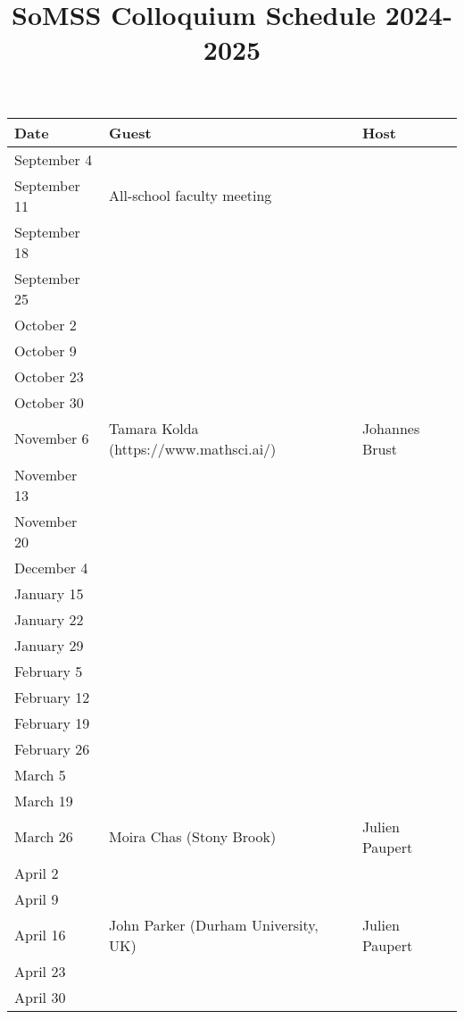 \documentclass[11pt]{article}
\begin{document}
\title{SoMSS Colloquium Schedule 2024-2025}
\author{}
\date{}
\maketitle



\begin{table}[htp]
\begin{center}
\begin{tabular}{|l|l|l|}
\hline
Date & Guest & Host\\
\hline
September 4 & & \\
September 11 & All-school faculty meeting & \\
September 18 & & \\
September 25 & & \\
October 2 & & \\
October 9 & & \\
October 23 & & \\
October 30 & & \\
November 6 & Tamara Kolda (https://www.mathsci.ai/) & Johannes Brust\\
November 13 & & \\
November 20 & & \\
December 4 & & \\
January 15 & & \\
January 22 & & \\
January 29 & & \\
February 5 & & \\
February 12 & & \\
February 19 & & \\
February 26  & & \\
March 5 & & \\
March 19 & & \\
March 26 & Moira Chas (Stony Brook) & Julien Paupert \\
April 2 & & \\
April 9 & & \\
April 16 & John Parker (Durham University, UK)& Julien Paupert \\
April 23 & & \\
April 30 & & \\
\hline
\end{tabular}
\end{center}
\label{default}
\end{table}%
\end{document}
